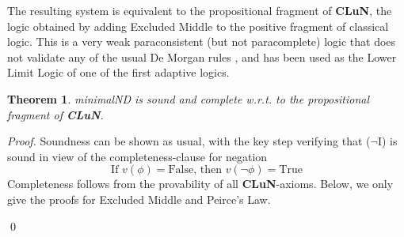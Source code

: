 \documentclass[]{article}
\newtheorem{theorem}{Theorem}
\newcommand{\TurnOne}[2]
    { {#1}\vdash_{\textbf{\sf 1}}  {#2}}
\newcommand{\TurnTwo}[2]
    { {#1}\vdash_{\textbf{\sf 2}}  {#2}}
\newcommand{\TurnThree}[2]
    { {#1}\vdash_{\textbf{\sf 3}}  {#2}}
\newcommand{\TurnFour}[2]
    { {#1}\vdash_{\textbf{\sf 4}}  {#2}}
\newcommand{\TurnFive}[2]
    { {#1}\vdash_{\textbf{\sf 5}}  {#2}}
\newcommand{\TurnSix}[2]
    { {#1}\vdash_{\textbf{\sf 6}}  {#2}}
\newcommand{\TurnSeven}[2]
    { {#1}\vdash_{\textbf{\sf 7}}  {#2}}
\begin{document}
The resulting system is equivalent to the propositional fragment of \textbf{CLuN}, the logic obtained by adding Excluded Middle to the positive fragment of classical logic. This is a very weak paraconsistent (but not paracomplete) logic that does not validate any of the usual De Morgan rules \cite{Batens:LogiqueAnalyse:1980}, and has been used as the Lower Limit Logic of one of the first adaptive logics.

\begin{theorem}\label{thm:clun}
    {\sf minimalND} is sound and complete w.r.t. to the propositional fragment of \textbf{CLuN}.
\end{theorem}
\noindent\textsl{Proof.} Soundness can be shown as usual, with the key step verifying that ($\neg$I) is sound in view of the completeness-clause for negation
\[
   \text{If } v(\phi) = \mathrm{False} \text{, then } v(\neg \phi) = \mathrm{True}\tag{C$\neg$}\label{eq:negclause}
\]
Completeness follows from the provability of all \textbf{CLuN}-axioms. Below, we only give the proofs for Excluded Middle and Peirce's Law.
\qed
\end{document}

